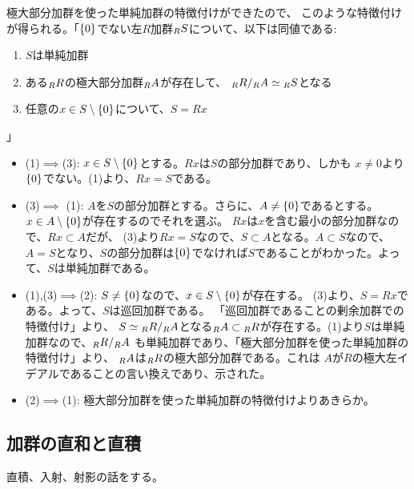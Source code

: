 \documentclass[9pt]{ltjsarticle}
\begin{document}
極大部分加群を使った単純加群の特徴付けができたので、
このような特徴付けが得られる。「$\{0\}$でない左$R$加群${}_{R}S$について、以下は同値である:
\begin{enumerate}[label=(\arabic*)]
  \item $S$は単純加群
  \item ある${}_{R}R$の極大部分加群${}_{R}A$が存在して、
  ${}_{R}R/{}_{R}A \simeq {}_{R}S$となる
  \item 任意の$x\in S\setminus\{0\}$について、$S = Rx$
\end{enumerate}
」
\begin{myproof}
  \begin{itemize}
    \item (1)$\implies$(3):
    $x\in S\setminus\{0\}$とする。$Rx$は$S$の部分加群であり、しかも
    $x\neq 0$より$\{0\}$でない。(1)より、$Rx = S$である。
    \item (3)$\implies$ (1):
    $A$を$S$の部分加群とする。さらに、$A\neq \{0\}$であるとする。
    $x\in A\setminus\{0\}$が存在するのでそれを選ぶ。
    $Rx$は$x$を含む最小の部分加群なので、$Rx \subset A$だが、
    (3)より$Rx=S$なので、$S\subset A$となる。$A\subset S$なので、
    $A=S$となり、$S$の部分加群は$\{0\}$でなければ$S$であることがわかった。よって、$S$は単純加群である。
    \item (1),(3)$\implies$(2):
    $S\neq \{0\}$なので、$x\in S\setminus\{0\}$が存在する。
    (3)より、$S=Rx$である。よって、$S$は巡回加群である。
    「巡回加群であることの剰余加群での特徴付け」より、
    $S\simeq {}_{R}R/{}_{R}A$となる${}_{R}A \subset {}_{R}R$が存在する。(1)より$S$は単純加群なので、${}_{R}R/{}_{R}A$
    も単純加群であり、「極大部分加群を使った単純加群の特徴付け」より、
    ${}_{R}A$は${}_{R}R$の極大部分加群である。これは
    $A$が$R$の極大左イデアルであることの言い換えであり、示された。
    \item (2)$\implies$(1):
    極大部分加群を使った単純加群の特徴付けよりあきらか。
  \end{itemize}
\end{myproof}

\subsection{加群の直和と直積}
\label{sub:加群の直和と直積}
直積、入射、射影の話をする。
\end{document}
